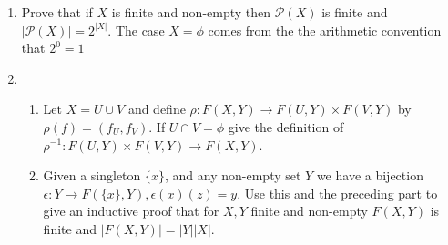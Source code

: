 \documentclass[11pt]{article}
\begin{document}
\begin{enumerate}
\newpage %
\item Prove that if $X$ is finite and non-empty then $\mathcal{P}(X)$ is finite and $|\mathcal{P}(X)| = 2^{|X|}$.  The case $X = \phi$ comes from the the arithmetic convention that $2^0 = 1$

\newpage %
\item
\begin{enumerate}
\item Let $X = U \cup V$ and define $\rho : F(X,Y) \to F(U,Y) \times F(V,Y)$ by $\rho(f) = (f_U,f_V)$.  If $U \cap V = \phi$ give the definition of $\rho^{-1} : F(U,Y) \times F(V,Y) \to F(X,Y)$. 
\item Given a singleton $\{x\}$, and any non-empty set $Y$ we have a bijection $\epsilon : Y \to F(\{x\}, Y), \epsilon(x)(z) = y$.  Use this and the preceding part to give an inductive proof that for $X, Y$ finite and non-empty $F(X,Y)$ is finite and $|F(X,Y)| = |Y||X|$.
\end{enumerate}

\end{enumerate} %
\end{document}
